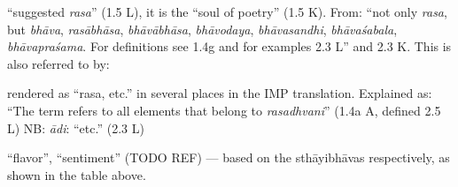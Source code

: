 \documentclass[10pt]{article}
\begin{document}
\begin{multicols}{2}
\begin{enumerate}[
			leftmargin=0em,
			rightmargin=0em,
		]
\begin{enumerate}
			 ``suggested \textit{rasa}'' (1.5 L),
			it is the ``soul of poetry'' (1.5 K).
			From: ``not only \textit{rasa},
			but \textit{bhāva}, %
			\textit{rasābhāsa}, %
			\textit{bhāvābhāsa}, %
			\textit{bhāvodaya}, %
			\textit{bhāvasandhi}, %
			\textit{bhāvaśabala}, %
			\textit{bhāvapraśama}. %
			For definitions see 1.4g and for examples 2.3 L''
			and 2.3 K. %
			This is also referred to by:
			\begin{itemize}
				 rendered as ``rasa, etc.'' in several places in the IMP translation.
				Explained as: ``The term refers to all elements that belong to \textit{rasadhvani}'' (1.4a A, defined 2.5 L) NB: \textit{ādi}: ``etc.'' (2.3 L)
			\end{itemize}



		\end{enumerate}

		 ``flavor'', ``sentiment'' (TODO REF) --- based on the sthāyibhāvas respectively, as shown in the table above.




\end{enumerate}
\end{multicols}
\end{document}
